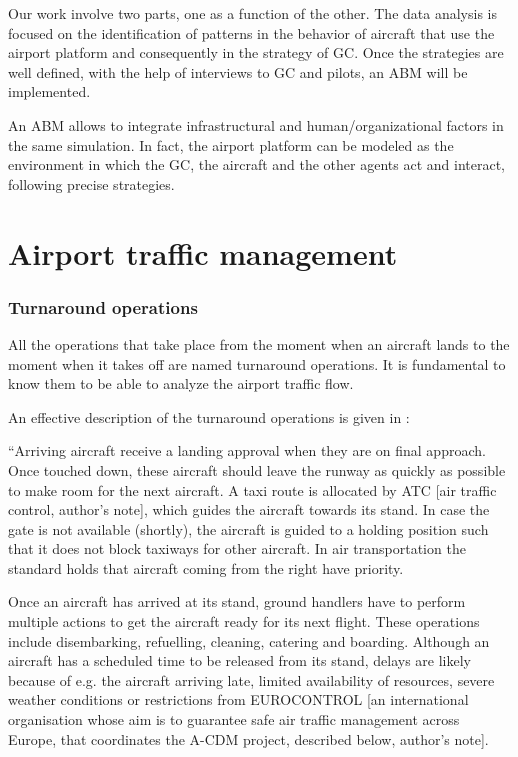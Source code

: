 \documentclass{article}
\begin{document}
Our work involve two parts, one as a function of the other. The data analysis is focused on the identification of patterns in the behavior of aircraft that use the airport platform and consequently in the strategy of GC. Once the strategies are well defined, with the help of interviews to GC and pilots, an ABM will be implemented. 

An ABM allows to integrate infrastructural and human/organizational factors in the same simulation. In fact, the airport platform can be modeled as the environment in which the GC, the aircraft and the other agents act and interact, following precise strategies.

\part{Airport traffic management}

\section{Turnaround operations}
All the operations that take place from the moment when an aircraft lands to the moment when it takes off are named turnaround operations. It is fundamental to know them to be able to analyze the airport traffic flow. 

An effective description of the turnaround operations is given in \cite{noortman}:

``Arriving aircraft receive a landing approval when they are on final approach. Once touched down, these aircraft should leave the runway as quickly as possible to make room for the next aircraft. A taxi route is allocated by ATC [air traffic control, author's note], which guides the aircraft towards its stand. In case the gate is not available (shortly), the aircraft is guided to a holding position such that it does not block taxiways for other aircraft. In air transportation the standard holds that aircraft coming from the right have priority.

Once an aircraft has arrived at its stand, ground handlers have to perform multiple actions to get the aircraft ready for its next flight. These operations include disembarking, refuelling, cleaning, catering and boarding. Although an aircraft has a scheduled time to be released from its stand, delays are likely because of e.g. the aircraft arriving late, limited availability of resources, severe weather conditions or restrictions from EUROCONTROL [an international organisation whose aim is to guarantee safe air traffic management across Europe, that coordinates the A-CDM project, described below, author's note].
\end{document}

